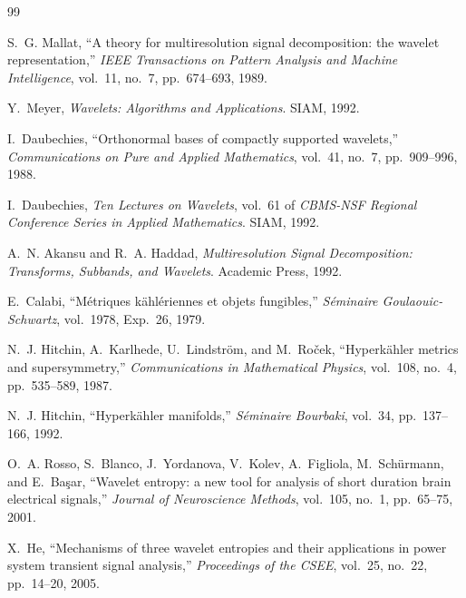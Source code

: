 \documentclass[11pt,preview,cite,epsf,twoside,amsfonts]{amsart}
\begin{document}
\begin{thebibliography}{99}

S.~G. Mallat, ``A theory for multiresolution signal decomposition: the wavelet representation,'' {\em IEEE Transactions on Pattern Analysis and Machine Intelligence}, vol.~11, no.~7, pp.~674--693, 1989.

Y.~Meyer, {\em Wavelets: Algorithms and Applications}.
\newblock SIAM, 1992.

I.~Daubechies, ``Orthonormal bases of compactly supported wavelets,'' {\em Communications on Pure and Applied Mathematics}, vol.~41, no.~7, pp.~909--996, 1988.

I.~Daubechies, {\em Ten Lectures on Wavelets}, vol.~61 of {\em CBMS-NSF Regional Conference Series in Applied Mathematics}.
\newblock SIAM, 1992.

A.~N. Akansu and R.~A. Haddad, {\em Multiresolution Signal Decomposition: Transforms, Subbands, and Wavelets}.
\newblock Academic Press, 1992.

E.~Calabi, ``M{\'e}triques k{\"a}hl{\'e}riennes et objets fungibles,'' {\em S{\'e}minaire Goulaouic-Schwartz}, vol.~1978, Exp.~26, 1979.

N.~J. Hitchin, A.~Karlhede, U.~Lindstr{\"o}m, and M.~Ro{\v{c}}ek, ``Hyperk{\"a}hler metrics and supersymmetry,'' {\em Communications in Mathematical Physics}, vol.~108, no.~4, pp.~535--589, 1987.

N.~J. Hitchin, ``Hyperk{\"a}hler manifolds,'' {\em S{\'e}minaire Bourbaki}, vol.~34, pp.~137--166, 1992.

O.~A. Rosso, S.~Blanco, J.~Yordanova, V.~Kolev, A.~Figliola, M.~Sch{\"u}rmann, and E.~Ba{\c{s}}ar, ``Wavelet entropy: a new tool for analysis of short duration brain electrical signals,'' {\em Journal of Neuroscience Methods}, vol.~105, no.~1, pp.~65--75, 2001.

X.~He, ``Mechanisms of three wavelet entropies and their applications in power system transient signal analysis,'' {\em Proceedings of the CSEE}, vol.~25, no.~22, pp.~14--20, 2005.

\end{thebibliography}
\end{document}
